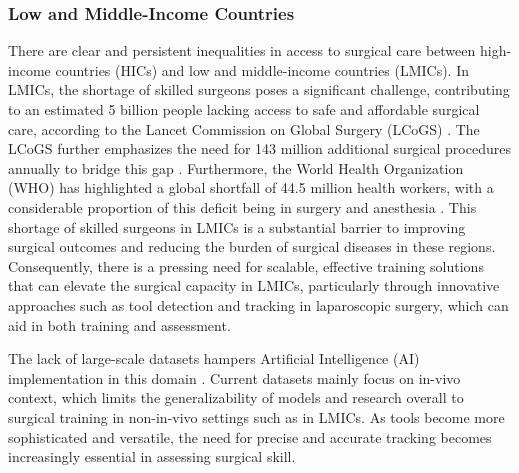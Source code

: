 \subsubsection{Low and Middle-Income Countries}

There are clear and persistent inequalities in access to surgical care between high-income countries (HICs) and low and middle-income countries (LMICs). In LMICs, the shortage of skilled surgeons poses a significant challenge, contributing to an estimated 5 billion people lacking access to safe and affordable surgical care, according to the Lancet Commission on Global Surgery (LCoGS) \cite{mearaglobal2015}. The LCoGS further emphasizes the need for 143 million additional surgical procedures annually to bridge this gap \cite{mearaglobal2015}. Furthermore, the World Health Organization (WHO) has highlighted a global shortfall of 44.5 million health workers, with a considerable proportion of this deficit being in surgery and anesthesia \cite{worldhealthorganizationglobal2016}. This shortage of skilled surgeons in LMICs is a substantial barrier to improving surgical outcomes and reducing the burden of surgical diseases in these regions. Consequently, there is a pressing need for scalable, effective training solutions that can elevate the surgical capacity in LMICs, particularly through innovative approaches such as tool detection and tracking in laparoscopic surgery, which can aid in both training and assessment.

The lack of large-scale datasets hampers Artificial Intelligence (AI) implementation in this domain \cite{nwoye_cholectrack20_2023}. Current datasets mainly focus on in-vivo context, which limits the generalizability of models and research overall to surgical training in non-in-vivo settings such as in LMICs. As tools become more sophisticated and versatile, the need for precise and accurate tracking becomes increasingly essential in assessing surgical skill.

